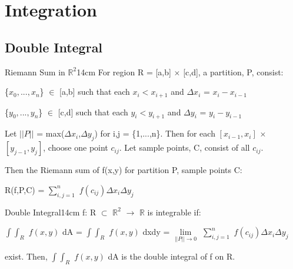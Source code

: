 \newpage

\section[Day 4: Integration]{ Integration }

\subsection{ Double Integral }

    \begin{definition}{Riemann Sum in $\mathbb{R}^2$}{14cm}
        For region R = [a,b] $\times$ [c,d], a {\color{lblue} partition}, P,
        consist:
        
        \hspace{0.5cm}
        \{$x_0,...,x_n$\} $\in$ [a,b] such that each $x_i < x_{i+1}$
        and $\Delta x_i$ = $x_i - x_{i-1}$
        
        \hspace{0.5cm}
        \{$y_0,...,y_n$\} $\in$ [c,d] such that each $y_i < y_{i+1}$
        and $\Delta y_i$ = $y_i - y_{i-1}$

        Let $||P||$ = max($\Delta x_i$,$\Delta y_j$) for i,j = \{1,...,n\}.
        Then for each $[x_{i-1},x_i]$ $\times$ $[y_{j-1},y_j]$,
        choose one point $c_{ij}$.
        Let {\color{lblue} sample points}, C, consist of all $c_{ij}$.

        Then the {\color{lblue} Riemann sum} of f(x,y) for partition P,
        sample points C:

        \hspace{0.5cm}
        R(f,P,C) = $\sum_{i,j=1}^n$ $f(c_{ij}) \Delta x_i \Delta y_j$
    \end{definition}

    \vspace{0.5cm}



    \begin{definition}{Double Integral}{14cm}
        f: R $\subset$ $\mathbb{R}^2$ $\rightarrow$ $\mathbb{R}$
        is {\color{lblue} integrable} if:

        \hspace{0.5cm}
        $\int \int_R$ $f(x,y)$ dA
        = $\int \int_R$ $f(x,y)$ dxdy
        = $\underset{||P|| \rightarrow 0}{\lim}$
            $\sum_{i,j=1}^n$ $f(c_{ij}) \Delta x_i \Delta y_j$

        exist. Then, $\int \int_R$ $f(x,y)$ dA
        is the {\color{lblue} double integral} of f on R.
    \end{definition}

